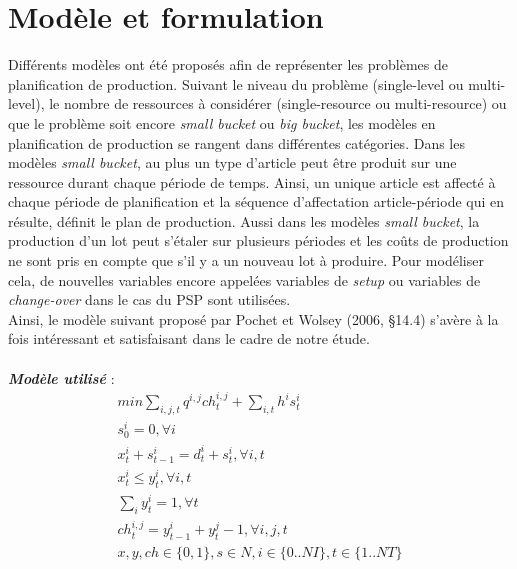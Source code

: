 \documentclass[12pt,a4paper]{article}
\begin{document}
		\section{Modèle et formulation}
		Différents modèles ont été proposés afin de représenter les problèmes de planification de production. Suivant le niveau du problème (single-level ou multi-level), le nombre de ressources à considérer (single-resource ou multi-resource) ou que le problème soit encore \emph{small bucket} ou \emph{big bucket}, les modèles en planification de production se rangent dans différentes catégories.   Dans les modèles \emph{small bucket}, au plus un type d'article  peut être produit sur une ressource durant chaque période de temps. Ainsi, un unique article est affecté à chaque période de planification et la séquence d'affectation article-période qui en résulte, définit le plan de production. Aussi dans les modèles \emph{small bucket}, la production d'un lot peut s'étaler sur plusieurs périodes et les coûts de production ne sont pris en compte que s'il y a un nouveau lot à produire. Pour modéliser cela, de nouvelles variables encore appelées variables de \emph{setup} ou variables de \emph{change-over} dans le cas du PSP sont utilisées. \\
		\hspace*{.5cm} Ainsi, le modèle suivant proposé par Pochet et Wolsey (2006, §14.4) s'avère à la fois intéressant et satisfaisant dans le cadre de notre étude.\\
		\\
		\textbf{\textsl{Modèle utilisé}} :
		\begin{eqnarray}
			min \sum_{i,j,t} q^{i,j}ch_{t}^{i,j} + \sum_{i,t} h^{i} s_{t}^{i} \\
			s_{0}^{i} = 0, \forall i \\
			x_{t}^{i} + s_{t-1}^{i} = d_{t}^{i} + s_{t}^{i}, \forall i,t \\
			x_{t}^{i} \leq y_{t}^{i}, \forall i,t \\
			\sum_{i} y_{t}^{i} = 1 , \forall t \\
			ch_{t}^{i,j} = y_{t-1}^{i} + y_{t}^{j} - 1, \forall i,j,t \\
			x,y,ch \in \{0,1\}, s \in N, i \in \{0..NI\}, t \in \{1..NT\}
		\end{eqnarray}
		
\end{document}
